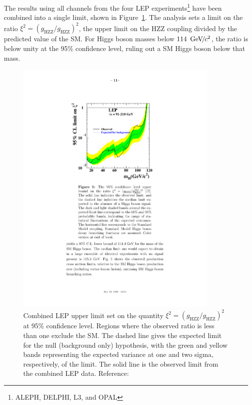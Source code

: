 The results using all channels from the four LEP experiments\footnote{ALEPH,
DELPHI, L3, and OPAL} have been combined into a single limit, shown in
Figure~\ref{fig:LEPHiggsLimit}.  The analysis sets a limit on the ratio $\xi^2 =
(g_\text{HZZ}/g_\text{HZZ})^2$, the upper limit on the HZZ coupling divided by
the predicted value of the SM\@.  For Higgs boson masses below $114~{\,\text{Ge\hspace{-.08em}V\hspace{-0.16em}/\hspace{-0.08em}}c^\text{2}}$, the
ratio is below unity at the 95\% confidence level, ruling out a SM
Higgs boson below that mass.
\begin{figure}
  \centering
  \includegraphics[width=100mm,angle=00]{theory_chapter/figures/lep_sm_limit.pdf}
  \caption[LEP SM Higgs boson limit plot]{Combined LEP upper limit set on the quantity
  \mbox{$\xi^2 = (g_\text{HZZ}/g_\text{HZZ})^2$} at 95\% confidence level.
  Regions where the observed ratio is less than one exclude the SM\@. The dashed
  line gives the expected limit for the null (background only) hypothesis, with
  the green and yellow bands representing the expected variance at one and two
  sigma, respectively, of the limit.  The solid line is the observed limit from
  the combined LEP data. Reference:~\cite{PDG} } \label{fig:LEPHiggsLimit}
\end{figure}

